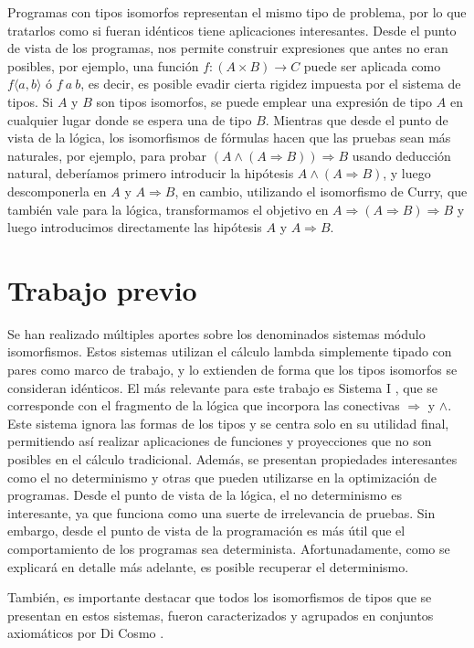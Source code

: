 Programas con tipos isomorfos representan el mismo tipo de problema, por lo que tratarlos como si fueran idénticos tiene aplicaciones interesantes.
Desde el punto de vista de los programas, nos permite construir expresiones que antes no eran posibles, por ejemplo, una función $f : (A \times B) \rightarrow C$ puede ser aplicada como $f \langle a, b \rangle$ ó $f \: a \: b$, es decir, es posible evadir cierta rigidez impuesta por el sistema de tipos.
Si $A$ y $B$ son tipos isomorfos, se puede emplear una expresión de tipo $A$ en cualquier lugar donde se espera una de tipo $B$.
Mientras que desde el punto de vista de la lógica, los isomorfismos de fórmulas hacen que las pruebas sean más naturales, por ejemplo, para probar $(A \wedge (A \Rightarrow  B)) \Rightarrow B$ usando deducción natural, deberíamos primero introducir la hipótesis $A \wedge (A \Rightarrow B)$, y luego descomponerla en $A$ y $A \Rightarrow B$, en cambio, utilizando el isomorfismo de Curry, que también vale para la lógica, transformamos el objetivo en $A \Rightarrow (A \Rightarrow  B) \Rightarrow B$ y luego introducimos directamente las hipótesis $A$ y $A \Rightarrow B$.

\section{Trabajo previo}

Se han realizado múltiples aportes sobre los denominados sistemas módulo isomorfismos.
Estos sistemas utilizan el cálculo lambda simplemente tipado con pares como marco de trabajo, y lo extienden de forma que los tipos isomorfos se consideran idénticos.
El más relevante para este trabajo es Sistema I \cite{system-i}, que se corresponde con el fragmento de la lógica que incorpora las conectivas $\Rightarrow$ y $\wedge$.
Este sistema ignora las formas de los tipos y se centra solo en su utilidad final, permitiendo así realizar aplicaciones de funciones y proyecciones que no son posibles en el cálculo tradicional.
Además, se presentan propiedades interesantes como el no determinismo y otras que pueden utilizarse en la optimización de programas.
Desde el punto de vista de la lógica, el no determinismo es interesante, ya que funciona como una suerte de irrelevancia de pruebas.
Sin embargo, desde el punto de vista de la programación es más útil que el comportamiento de los programas sea determinista.
Afortunadamente, como se explicará en detalle más adelante, es posible recuperar el determinismo.

También, es importante destacar que todos los isomorfismos de tipos que se presentan en estos sistemas, fueron caracterizados y agrupados en conjuntos axiomáticos por Di Cosmo \cite{MSCSSurvey05}.

